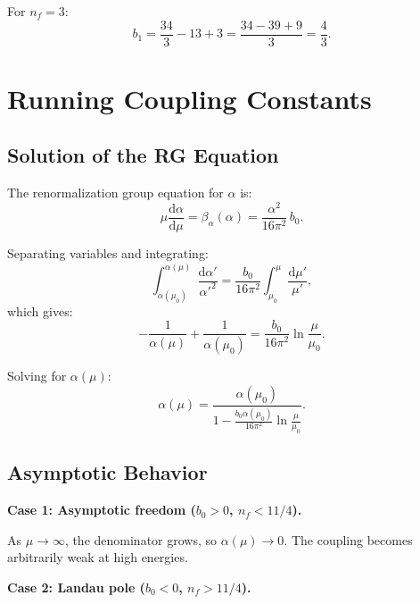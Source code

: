 \documentclass[11pt,a4paper]{article}
\numberwithin{equation}{section}
\theoremstyle{plain}
\theoremstyle{definition}
\theoremstyle{remark}
\newcommand{\dd}{\mathrm{d}}
\begin{document}
For $n_f=3$:
\begin{equation}
b_1 = \frac{34}{3} - 13 + 3 = \frac{34-39+9}{3} = \frac{4}{3}.
\label{eq:b1-nf3}
\end{equation}

\vspace{1em}

\section{Running Coupling Constants}\label{sec:running}

\subsection{Solution of the RG Equation}

The renormalization group equation for $\alpha$ is:
\begin{equation}
\mu\frac{\dd\alpha}{\dd\mu} = \beta_\alpha(\alpha) = \frac{\alpha^2}{16\pi^2}\,b_0.
\label{eq:RG-alpha}
\end{equation}

Separating variables and integrating:
\begin{equation}
\int_{\alpha(\mu_0)}^{\alpha(\mu)} \frac{\dd\alpha'}{\alpha'^2} = \frac{b_0}{16\pi^2}\int_{\mu_0}^\mu \frac{\dd\mu'}{\mu'},
\label{eq:RG-integral}
\end{equation}
which gives:
\begin{equation}
-\frac{1}{\alpha(\mu)} + \frac{1}{\alpha(\mu_0)} = \frac{b_0}{16\pi^2}\ln\frac{\mu}{\mu_0}.
\label{eq:RG-solved}
\end{equation}

Solving for $\alpha(\mu)$:
\begin{equation}
\alpha(\mu) = \frac{\alpha(\mu_0)}{1 - \frac{b_0\alpha(\mu_0)}{16\pi^2}\ln\frac{\mu}{\mu_0}}.
\label{eq:alpha-running}
\end{equation}

\subsection{Asymptotic Behavior}

\textbf{Case 1: Asymptotic freedom ($b_0>0$, $n_f<11/4$).}

As $\mu\to\infty$, the denominator grows, so $\alpha(\mu)\to 0$. The coupling becomes arbitrarily weak at high energies.

\textbf{Case 2: Landau pole ($b_0<0$, $n_f>11/4$).}
\end{document}
